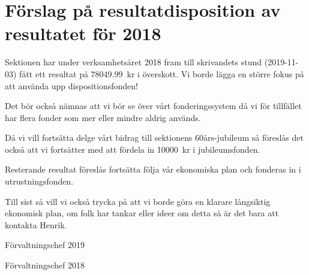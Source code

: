 \documentclass[../_main/handlingar.tex]{subfiles}
\begin{document}
\section{Förslag på resultatdisposition av resultatet för 2018}

Sektionen har under verksamhetsåret 2018 fram till skrivandets stund (2019-11-03) fått ett resultat på \SI{78049.99}{kr} i överskott. Vi borde lägga en större fokus på att använda upp dispositionsfonden! 

Det bör också nämnas att vi bör se över vårt fonderingssystem då vi för tillfället har flera fonder som mer eller mindre aldrig används.

Då vi vill fortsätta delge vårt bidrag till sektionens 60års-jubileum så föreslås det också att vi fortsätter med att fördela in \SI{10 000}{kr} i jubileumsfonden.

Resterande resultat föreslås fortsätta följa vår ekonomiska plan och fonderas in i utrustningsfonden.

Till sist så vill vi också trycka på att vi borde göra en klarare långsiktig ekonomisk plan, om folk har tankar eller ideer om detta så är det bara att kontakta Henrik.

\begin{signatures}{2}
    \ist
    \signature{\fvc}{Förvaltningschef 2019}
    \signature{Magnus Lundh}{Förvaltningschef 2018}
\end{signatures}
\end{document}
